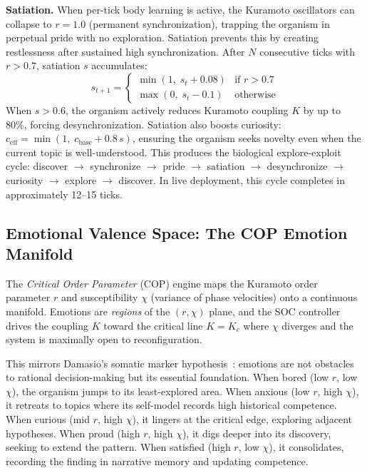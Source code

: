 \documentclass[11pt,a4paper,twocolumn]{article}
\begin{document}
\textbf{Satiation.} When per-tick body learning is active, the Kuramoto oscillators can collapse to $r = 1.0$ (permanent synchronization), trapping the organism in perpetual pride with no exploration. Satiation prevents this by creating restlessness after sustained high synchronization. After $N$ consecutive ticks with $r > 0.7$, satiation $s$ accumulates:
\begin{equation}
s_{t+1} = \begin{cases} \min(1,\; s_t + 0.08) & \text{if } r > 0.7 \\ \max(0,\; s_t - 0.1) & \text{otherwise} \end{cases}
\end{equation}
When $s > 0.6$, the organism actively reduces Kuramoto coupling $K$ by up to 80\%, forcing desynchronization. Satiation also boosts curiosity: $c_\text{eff} = \min(1,\; c_\text{base} + 0.8\,s)$, ensuring the organism seeks novelty even when the current topic is well-understood. This produces the biological explore-exploit cycle: discover $\to$ synchronize $\to$ pride $\to$ satiation $\to$ desynchronize $\to$ curiosity $\to$ explore $\to$ discover. In live deployment, this cycle completes in approximately 12--15 ticks.

\subsection{Emotional Valence Space: The COP Emotion Manifold}

The \emph{Critical Order Parameter} (COP) engine maps the Kuramoto order parameter $r$
and susceptibility $\chi$ (variance of phase velocities) onto a continuous manifold.
Emotions are \emph{regions} of the $(r, \chi)$ plane, and the SOC controller drives the
coupling $K$ toward the critical line $K = K_c$ where $\chi$ diverges and the system is
maximally open to reconfiguration.

This mirrors Damasio's somatic marker hypothesis~\cite{damasio1999}: emotions are not obstacles
to rational decision-making but its essential foundation.
When bored (low $r$, low $\chi$), the organism jumps to its least-explored area.
When anxious (low $r$, high $\chi$), it retreats to topics where its self-model records high historical competence.
When curious (mid $r$, high $\chi$), it lingers at the critical edge, exploring adjacent hypotheses.
When proud (high $r$, high $\chi$), it digs deeper into its discovery, seeking to extend the pattern.
When satisfied (high $r$, low $\chi$), it consolidates, recording the finding in narrative memory and updating competence.
\end{document}

